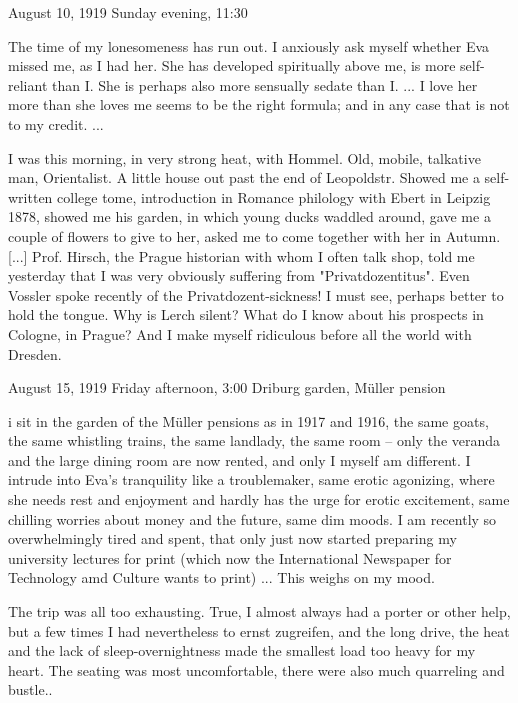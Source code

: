 August 10, 1919
Sunday evening, 11:30

The time of my lonesomeness has run out. I anxiously ask myself whether Eva missed me, as I had her. She has developed spiritually above me, is more self-reliant than I. She is perhaps also more sensually sedate than I. {...} I love her more than she loves me seems to be the right formula; {and in any case that is not to my credit}. {...}

I was this morning, in very strong heat, with Hommel. Old, mobile, talkative man, Orientalist. A little house out {past} the end of Leopoldstr. Showed me {a self-written college tome}, introduction in Romance philology with Ebert in Leipzig 1878, showed me his garden, in which young ducks waddled around, gave me a couple of flowers to give to her, asked me to come together with her in Autumn. [...] Prof. Hirsch, the Prague historian with whom I often talk shop, told me yesterday that I was very obviously suffering from "Privatdozentitus". Even Vossler spoke recently of the Privatdozent-sickness! I must see, perhaps better to hold the tongue. {Why is Lerch silent?} What do I know about his prospects in Cologne, in Prague? And I make myself ridiculous before all the world with Dresden.

August 15, 1919
Friday afternoon, 3:00
Driburg garden, Müller pension

i sit in the garden of the Müller pensions as in 1917 and 1916, the same goats, the same whistling trains, the same landlady, the same room -- only the veranda and the large dining room are now rented, and only I myself am different. I intrude into Eva's tranquility like a {troublemaker}, same erotic agonizing, where she needs rest and enjoyment and hardly has the urge for erotic excitement, same chilling worries about money and the future, same dim moods. I am recently so overwhelmingly tired and spent, that only just now started preparing my university lectures for print (which now the International Newspaper for Technology amd Culture wants to print) {...} This weighs on my mood.

The trip was all too exhausting. True, I almost always had a porter or other help, but a few times I had nevertheless to {ernst zugreifen}, and the long drive, the heat and the {lack of sleep-overnightness} made the smallest load too heavy for my heart. The seating was most uncomfortable, there were also much quarreling and bustle..

